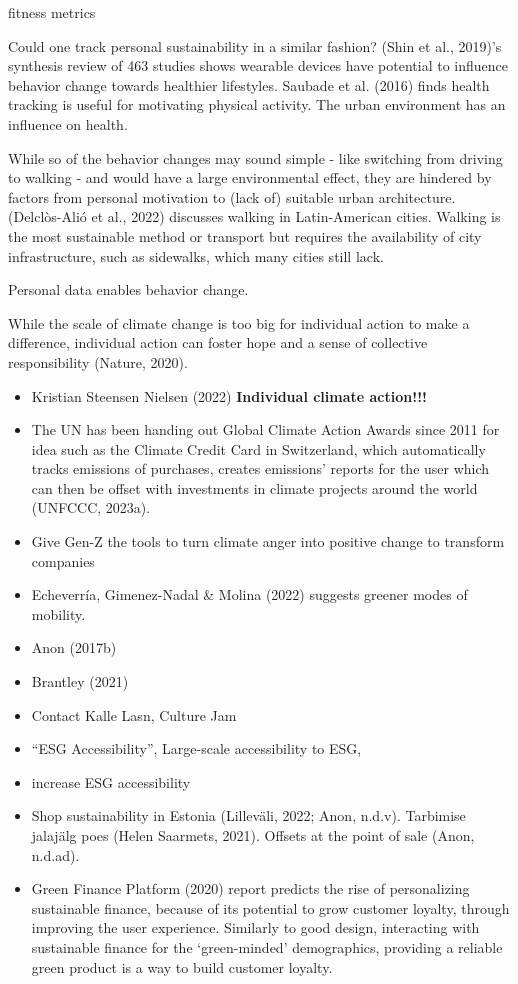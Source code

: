\documentclass[
  letterpaper,
  DIV=11,
  numbers=noendperiod]{scrartcl}
\begin{document}
fitness metrics

Could one track personal sustainability in a similar fashion? (Shin et
al., 2019)'s synthesis review of 463 studies shows wearable devices have
potential to influence behavior change towards healthier lifestyles.
Saubade et al. (2016) finds health tracking is useful for motivating
physical activity. The urban environment has an influence on health.

While so of the behavior changes may sound simple - like switching from
driving to walking - and would have a large environmental effect, they
are hindered by factors from personal motivation to (lack of) suitable
urban architecture. (Delclòs-Alió et al., 2022) discusses walking in
Latin-American cities. Walking is the most sustainable method or
transport but requires the availability of city infrastructure, such as
sidewalks, which many cities still lack.

Personal data enables behavior change.

While the scale of climate change is too big for individual action to
make a difference, individual action can foster hope and a sense of
collective responsibility (Nature, 2020).

\begin{itemize}
\item
  Kristian Steensen Nielsen (2022) \textbf{Individual climate action!!!}
\item
  The UN has been handing out Global Climate Action Awards since 2011
  for idea such as the Climate Credit Card in Switzerland, which
  automatically tracks emissions of purchases, creates emissions'
  reports for the user which can then be offset with investments in
  climate projects around the world (UNFCCC, 2023a).
\item
  Give Gen-Z the tools to turn climate anger into positive change to
  transform companies
\item
  Echeverría, Gimenez-Nadal \& Molina (2022) suggests greener modes of
  mobility.
\item
  Anon (2017b)
\item
  Brantley (2021)
\item
  Contact Kalle Lasn, Culture Jam
\item
  ``ESG Accessibility'', Large-scale accessibility to ESG,
\item
  increase ESG accessibility
\item
  Shop sustainability in Estonia (Lilleväli, 2022; Anon, n.d.v).
  Tarbimise jalajälg poes (Helen Saarmets, 2021). Offsets at the point
  of sale (Anon, n.d.ad).
\item
  Green Finance Platform (2020) report predicts the rise of
  personalizing sustainable finance, because of its potential to grow
  customer loyalty, through improving the user experience. Similarly to
  good design, interacting with sustainable finance for the
  `green-minded' demographics, providing a reliable green product is a
  way to build customer loyalty.
\end{itemize}
\end{document}
